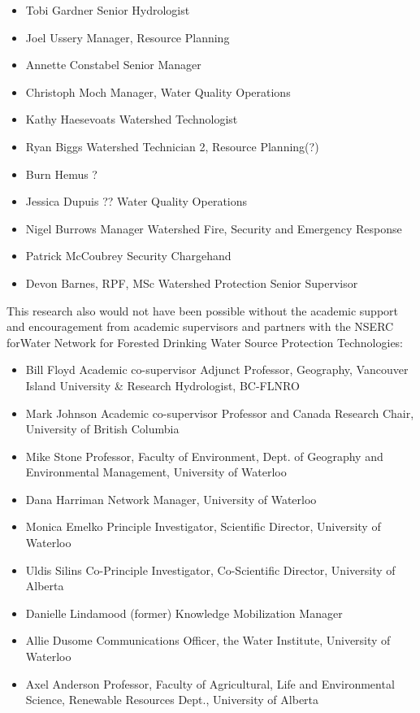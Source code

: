 \documentclass[]{article}
\providecommand{\tightlist}{%
  \setlength{\itemsep}{0pt}\setlength{\parskip}{0pt}}
\begin{document}
\begin{itemize}
\tightlist
\item
  Tobi Gardner \textbar{} Senior Hydrologist
\item
  Joel Ussery \textbar{} Manager, Resource Planning
\item
  Annette Constabel \textbar{} Senior Manager
\item
  Christoph Moch \textbar{} Manager, Water Quality Operations
\item
  Kathy Haesevoats \textbar{} Watershed Technologist
\item
  Ryan Biggs \textbar{} Watershed Technician 2, Resource Planning(?)
\item
  Burn Hemus \textbar{} ?
\item
  Jessica Dupuis \textbar{} ?? Water Quality Operations
\item
  Nigel Burrows \textbar{} Manager Watershed Fire, Security and
  Emergency Response
\item
  Patrick McCoubrey \textbar{} Security Chargehand
\item
  Devon Barnes, RPF, MSc \textbar{} Watershed Protection Senior
  Supervisor
\end{itemize}

This research also would not have been possible without the academic
support and encouragement from academic supervisors and partners with
the NSERC forWater Network for Forested Drinking Water Source Protection
Technologies:

\begin{itemize}
\tightlist
\item
  Bill Floyd \textbar{} Academic co-supervisor \textbar{} Adjunct
  Professor, Geography, Vancouver Island University \& Research
  Hydrologist, BC-FLNRO
\item
  Mark Johnson \textbar{} Academic co-supervisor \textbar{} Professor
  and Canada Research Chair, University of British Columbia
\item
  Mike Stone \textbar{} Professor, Faculty of Environment, Dept. of
  Geography and Environmental Management, University of Waterloo
\item
  Dana Harriman \textbar{} Network Manager, University of Waterloo
\item
  Monica Emelko \textbar{} Principle Investigator, Scientific Director,
  University of Waterloo
\item
  Uldis Silins \textbar{} Co-Principle Investigator, Co-Scientific
  Director, University of Alberta
\item
  Danielle Lindamood \textbar{}(former) Knowledge Mobilization Manager
\item
  Allie Dusome \textbar{} Communications Officer, the Water Institute,
  University of Waterloo
\item
  Axel Anderson \textbar{} Professor, Faculty of Agricultural, Life and
  Environmental Science, Renewable Resources Dept., University of
  Alberta
\end{itemize}
\end{document}
